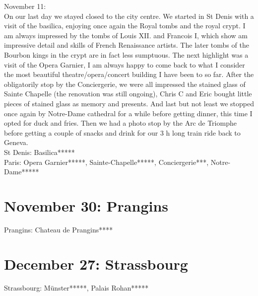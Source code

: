 November 11:\\
On our last day we stayed closed to the city centre. We started in St Denis with a visit of the basilica, enjoying once again the Royal tombs and the royal crypt. I am always impressed by the tombs of Louis XII. and Francois I, which show am impressive detail and skills of French Renaissance artists. The later tombs of the Bourbon kings in the crypt are in fact less sumptuous. The next highlight was a visit of the Opera Garnier, I am always happy to come back to what I consider the most beautiful theatre/opera/concert building I have been to so far. After the obligatorily stop by the Conciergerie, we were all impressed the stained glass of Sainte Chapelle (the renovation was still ongoing), Chris C and Eric bought little pieces of stained glass as memory and presents. And last but not least we stopped once again by Notre-Dame cathedral for a while before getting dinner, this time I opted for duck and fries. Then we had a photo stop by the Arc de Triomphe before getting a couple of snacks and drink for our 3 h long train ride back to Geneva.\\

St Denis: Basilica*****\\
Paris: Opera Garnier*****, Sainte-Chapelle*****, Conciergerie***, Notre-Dame*****

\section{November 30: Prangins}
\label{2013:Prangins}

Prangins: Chateau de Prangins****

\section{December 27: Strassbourg}
\label{2013Strassbourg}

Strassbourg: M\"unster*****, Palais Rohan*****